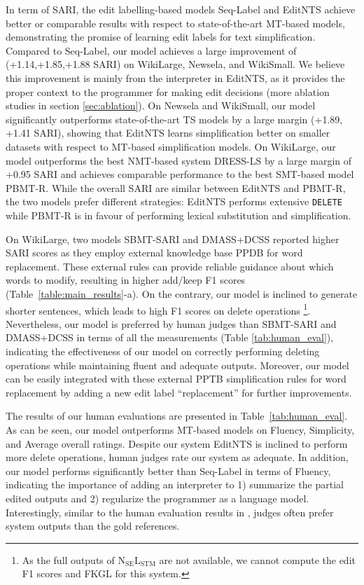 \documentclass[11pt,a4paper]{article}
\def\delete{{\texttt{DELETE}}}
\def\seqlabel{Seq-Label}
\def\seqlabels{Seq-Label }
\def\wikilarge{WikiLarge}
\def\wikismall{WikiSmall}
\def\newsela{Newsela}
\def\editnet{EditNTS}
\begin{document}
In term of SARI, the edit labelling-based models \seqlabels and \editnet{} achieve better or comparable results with respect to state-of-the-art MT-based models, demonstrating the promise of learning edit labels for text simplification. Compared to \seqlabel, our model achieves a large improvement of (+1.14,+1.85,+1.88 SARI) on \wikilarge, \newsela, and \wikismall. We believe this improvement is mainly from the interpreter in \editnet, as it provides the proper context to the programmer for making edit decisions (more ablation studies in section \ref{sec:ablation}). On Newsela and \wikismall{}, our model significantly outperforms  state-of-the-art TS models by a large margin (+1.89, +1.41 SARI), showing that  \editnet{} learns simplification better on smaller datasets with respect to MT-based simplification models. On \wikilarge{}, our model outperforms  the best NMT-based system DRESS-LS by a large margin of +0.95 SARI and achieves comparable performance to the best SMT-based model PBMT-R. While the overall SARI are similar between \editnet{} and PBMT-R,  the two models prefer different strategies: \editnet{} performs extensive \delete{} while PBMT-R is in favour of performing lexical substitution and simplification. 

On \wikilarge, two models SBMT-SARI and DMASS+DCSS reported higher SARI scores as they employ external knowledge base PPDB for word replacement. These external rules can provide reliable
guidance about which words to modify, resulting in higher add/keep F1 scores (Table~\ref{table:main_results}-a). On the contrary, our model is inclined to generate shorter sentences, which leads to high F1 scores on delete operations \footnote{As the full outputs of $\text{N}_{\text{SE}}\text{L}_{\text{STM}}$ are not available, we cannot compute the edit F1 scores and FKGL for this system.}. Nevertheless, our model is preferred by human judges than SBMT-SARI and DMASS+DCSS in terms of all the measurements (Table \ref{tab:human_eval}), indicating the effectiveness of our model on correctly performing deleting operations while maintaining fluent and adequate outputs.  Moreover, our model can be easily integrated with these external PPTB simplification rules for word replacement by adding a new edit label ``replacement'' for further improvements.



The results of our human evaluations are presented in Table~\ref{tab:human_eval}. As can be seen, our model outperforms MT-based models on Fluency, Simplicity, and Average overall ratings. Despite our system \editnet{} is inclined to perform more delete operations, human judges rate our system as adequate. In addition, our model performs significantly better than \seqlabels in terms of Fluency, indicating the importance of adding an interpreter to 1) summarize the partial edited outputs and 2) regularize the programmer as a language model. Interestingly, similar to the human evaluation results in \citet{zhang2017sentence}, judges often prefer system outputs than the gold references.
 
\end{document}
